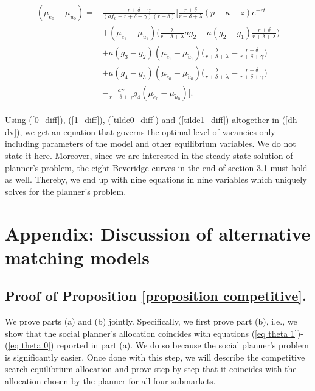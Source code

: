 \documentclass[12pt]{article} %
\theoremstyle{definition}
\begin{document}
\begin{appendix}
\begin{fleqn}
\begin{align}
\begin{split}
 (\mu_{e_0}-\mu_{u_0}) =& \frac{r+\delta+\gamma}{(af_0+r+\delta+\gamma)(r+\delta)}\Biggl[\frac{r+\delta}{r+\delta+\lambda}(p-\kappa-z)e^{-rt} \\
& +(\mu_{e_1}-\mu_{u_1})\biggl(\frac{\lambda}{r+\delta+\lambda}ag_2-a(g_2-g_1)\frac{r+\delta}{r+\delta+\lambda}\biggr)\\
& +a(g_3-g_2)(\mu_{\tilde{e}_1}-\mu_{\tilde{u}_1})\biggl(\frac{\lambda}{r+\delta+\lambda}-\frac{r+\delta}{r+\delta+\gamma}\biggr) \\
& + a(g_4-g_3)(\mu_{\tilde{e}_0}-\mu_{\tilde{u}_0})\biggl(\frac{\lambda}{r+\delta+\lambda}-\frac{r+\delta}{r+\delta+\gamma}\biggr)\\
& -\frac{a\gamma}{r+\delta+\gamma}g_4(\mu_{\tilde{e}_0}-\mu_{\tilde{u}_0}) \Biggr]. \label{0_diff}
\end{split}
\end{align}
\end{fleqn}
Using (\ref{0_diff}), (\ref{1_diff}), (\ref{tilde0_diff}) and (\ref{tilde1_diff}) altogether in (\ref{dh dv}), we get an equation that governs the optimal level of vacancies only including parameters of the model and other equilibrium variables. We do not state it here. Moreover, since we are interested in the steady state solution of planner's problem, the eight Beveridge curves in the end of section 3.1 must hold as well. Thereby, we end up with nine equations in nine variables which uniquely solves for the planner's problem.


\section{Appendix: Discussion of alternative matching models
\label{section appendix alternative models}}

\subsection{Proof of Proposition \ref{proposition competitive}.}\label{section appendix competitive}

We prove parts (a) and (b) jointly. Specifically, we first prove part (b), i.e., we show that the social planner's allocation coincides with equations (\ref{eq theta 1})-(\ref{eq theta 0}) reported in part (a). We do so because the social planner's problem is significantly easier. Once done with this step, we will describe the competitive search equilibrium allocation and prove step by step that it coincides with the allocation chosen by the planner for all four submarkets. 


\end{appendix}
\end{document}
